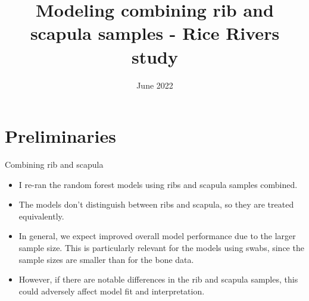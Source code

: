 \documentclass{beamer}
\title[]{Modeling combining rib and scapula samples - Rice Rivers study}
\date{June 2022}
\begin{document}
\begin{frame}
   \titlepage
\end{frame}









\section{Preliminaries}

\begin{frame}{Combining rib and scapula}

  \begin{itemize}
    \item I re-ran the random forest models using ribs and scapula samples combined.
    \item The models don't distinguish between ribs and scapula, so they are
    treated equivalently.
    \item In general, we expect improved overall model performance due to the
    larger sample size.  This is particularly relevant for the models using
    swabs, since the sample sizes are smaller than for the bone data.
    \item However, if there are notable differences in the rib and scapula
    samples, this could adversely affect model fit and interpretation.
  \end{itemize}

\end{frame}
\end{document}
